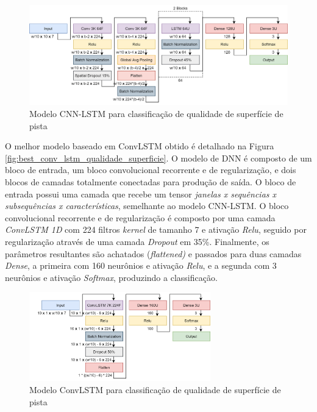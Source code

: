 \begin{figure}[h!]
  \centering
  \caption{Modelo CNN-LSTM para classificação de qualidade de superfície de pista}
  \label{fig:best_cnn_lstm_qualidade_superficie}
  \includegraphics[width=1\textwidth]{figuras/fig_49.png}
\end{figure}

O melhor modelo baseado em ConvLSTM obtido é detalhado na Figura \autoref{fig:best_conv_lstm_qualidade_superficie}. O modelo de DNN é composto de um bloco de entrada, um bloco convolucional recorrente e de regularização, e dois blocos de camadas totalmente conectadas para produção de saída. O bloco de entrada possui uma camada que recebe um tensor \emph{janelas x sequências x subsequências x características}, semelhante ao modelo CNN-LSTM. O bloco convolucional recorrente e de regularização é composto por uma camada \textit{ConvLSTM 1D} com 224 filtros \textit{kernel} de tamanho 7 e ativação \textit{Relu}, seguido por regularização através de uma camada \textit{Dropout} em 35\%. Finalmente, os parâmetros resultantes são achatados (\textit{flattened)} e passados para duas camadas \textit{Dense}, a primeira com 160 neurônios e ativação \textit{Relu}, e a segunda com 3 neurônios e ativação \textit{Softmax}, produzindo a classificação.

\begin{figure}[ht!]
  \centering
  \caption{Modelo ConvLSTM para classificação de qualidade de superfície de pista}
  \label{fig:best_conv_lstm_qualidade_superficie}
  \includegraphics[width=0.7\textwidth]{figuras/fig_50.png}
\end{figure}

